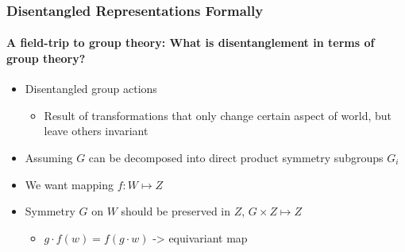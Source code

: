 \documentclass[9pt]{beamer}
\begin{document}
\begin{frame}
\frametitle{Disentangled Representations Formally}
\framesubtitle{A field-trip to group theory: What is disentanglement in terms of group theory?}
\begin{itemize}%
	\item Disentangled group actions
	\begin{itemize}
		\item Result of transformations that only change certain aspect of world, but leave others invariant
	\end{itemize}
	\item Assuming $G$ can be decomposed into direct product symmetry subgroups $G_i$
	\item We want mapping $f:W \mapsto Z$
	\item Symmetry $G$ on $W$ should be preserved in $Z$, $G \times Z \mapsto Z$
	\begin{itemize}
		\item $g \cdot f(w) = f(g\cdot w)$ -> equivariant map
	\end{itemize}
\end{itemize}
\end{frame} 
\end{document}
